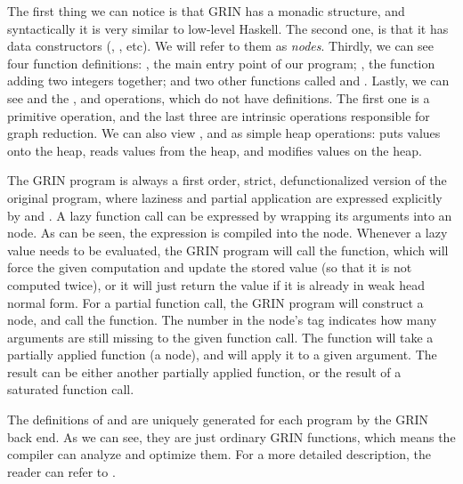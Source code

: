 \documentclass[main.tex]{subfiles}
\begin{document}
	The first thing we can notice is that GRIN has a monadic structure, and syntactically it is very similar to low-level Haskell. The second one, is that it has data constructors (, , etc). We will refer to them as \emph{nodes}. Thirdly, we can see four function definitions: , the main entry point of our program; , the function adding two integers together; and two other functions called  and . Lastly, we can see  and the ,  and  operations, which do not have definitions. The first one is a primitive operation, and the last three are intrinsic operations responsible for graph reduction. We can also view ,  and  as simple heap operations:  puts values onto the heap,   reads values from the heap, and  modifies values on the heap.
	
	
	The GRIN program is always a first order, strict, defunctionalized version of the original program, where laziness and partial application are expressed explicitly by  and . A lazy function call can be expressed by wrapping its arguments into an  node. As can be seen, the  expression is compiled into the  node. Whenever a lazy value needs to be evaluated, the GRIN program will call the   function, which will force the given computation and update the stored value (so that it is not computed twice), or it will just return the value if it is already in weak head normal form. For a partial function call, the GRIN program will construct a  node, and call the  function. The number in the  node's tag indicates how many arguments are still missing to the given function call. The  function will take a partially applied function (a  node), and will apply it to a given argument. The result can be either another partially applied function, or the result of a saturated function call.
	
	The definitions of  and  are uniquely generated for each program by the GRIN back end. As we can see, they are just ordinary GRIN functions, which means the compiler can analyze and optimize them. For a more detailed description, the reader can refer to \cite{boquist-grin, boquist-phd}.
	
\end{document}
